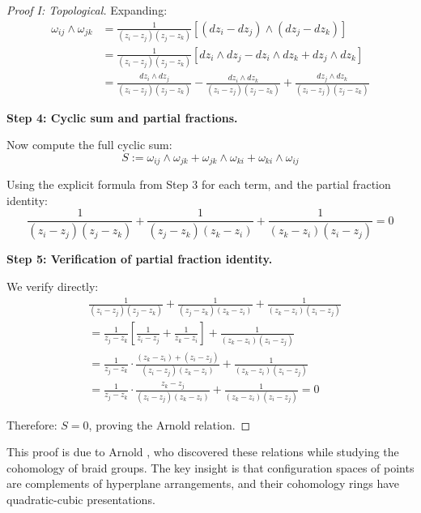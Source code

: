\begin{proof}[Proof I: Topological]
Expanding:
\begin{align}
\omega_{ij} \wedge \omega_{jk} &= \frac{1}{(z_i - z_j)(z_j - z_k)} \left[(dz_i - dz_j) 
\wedge (dz_j - dz_k)\right]\\
&= \frac{1}{(z_i - z_j)(z_j - z_k)} \left[dz_i \wedge dz_j - dz_i \wedge dz_k + 
dz_j \wedge dz_k\right]\\
&= \frac{dz_i \wedge dz_j}{(z_i - z_j)(z_j - z_k)} - \frac{dz_i \wedge dz_k}{
(z_i - z_j)(z_j - z_k)} + \frac{dz_j \wedge dz_k}{(z_i - z_j)(z_j - z_k)}
\end{align}

\textbf{Step 4: Cyclic sum and partial fractions.}

Now compute the full cyclic sum:
\begin{equation}
S := \omega_{ij} \wedge \omega_{jk} + \omega_{jk} \wedge \omega_{ki} + \omega_{ki} 
\wedge \omega_{ij}
\end{equation}

Using the explicit formula from Step 3 for each term, and the partial fraction identity:
\begin{equation}
\frac{1}{(z_i - z_j)(z_j - z_k)} + \frac{1}{(z_j - z_k)(z_k - z_i)} + \frac{1}{
(z_k - z_i)(z_i - z_j)} = 0
\end{equation}

\textbf{Step 5: Verification of partial fraction identity.}

We verify directly:
\begin{align}
&\frac{1}{(z_i - z_j)(z_j - z_k)} + \frac{1}{(z_j - z_k)(z_k - z_i)} + \frac{1}{
(z_k - z_i)(z_i - z_j)}\\
&= \frac{1}{z_j - z_k} \left[\frac{1}{z_i - z_j} + \frac{1}{z_k - z_i}\right] + 
\frac{1}{(z_k - z_i)(z_i - z_j)}\\
&= \frac{1}{z_j - z_k} \cdot \frac{(z_k - z_i) + (z_i - z_j)}{(z_i - z_j)(z_k - z_i)} 
+ \frac{1}{(z_k - z_i)(z_i - z_j)}\\
&= \frac{1}{z_j - z_k} \cdot \frac{z_k - z_j}{(z_i - z_j)(z_k - z_i)} + \frac{1}{
(z_k - z_i)(z_i - z_j)} = 0
\end{align}

Therefore: $S = 0$, proving the Arnold relation. \qedhere
\end{proof}

\begin{remark}
This proof is due to Arnold \cite{Arnold69}, who discovered these relations while 
studying the cohomology of braid groups. The key insight is that configuration spaces 
of points are complements of hyperplane arrangements, and their cohomology rings have 
quadratic-cubic presentations.
\end{remark}

